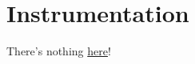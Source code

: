 \part{Instrumentation}\label{Instrumentation}

There's nothing \href{https://rick.nerial.uk/video.mp4}{here}!